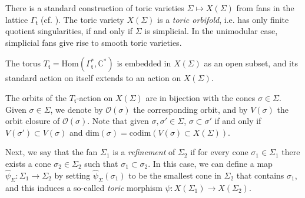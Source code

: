 There is a standard construction of toric varieties $\Sigma\mapsto X(\Sigma)$ 
from fans in the lattice $\Gamma_\mathfrak{t}$ (cf.  \cite[\S1.4]{Fulton}). The 
toric variety $X(\Sigma)$ is a \textit{toric orbifold}, i.e.  has only finite 
quotient singularities, if and only if $\Sigma$ is simplicial. In the 
unimodular case, simplicial fans give rise to smooth toric varieties. 


The torus $T_{\mathfrak{t}} = \mathrm{Hom}(\Gamma_\mathfrak{t}^*, 
\mathbb{C}^*)$ is embedded in $X(\Sigma)$ as an open subset, and its 
standard action on itself extends to an action on $X(\Sigma)$.




\begin{nota}\label{notation:toricorb}
The orbits of the $T_{\mathfrak{t}}$-action on 
$X(\Sigma)$ are in bijection with the cones $\sigma\in\Sigma$. Given 
$\sigma\in\Sigma$, we denote by $\mathcal{O}(\sigma)$ the corresponding orbit, 
and by $V(\sigma)$ the orbit closure of $\mathcal{O}(\sigma)$. Note that given $\sigma, \sigma'\in\Sigma$, 
$\sigma\subset\sigma'$ if and only if $V({\sigma'})\subset V(\sigma)$ and 
$\mathrm{dim}(\sigma)=\mathrm{codim}(V(\sigma)\subset X(\Sigma))$. 
\end{nota}



Next, we say that the fan $\Sigma_1$ is a \textit{refinement} of $\Sigma_2$ if for every cone $\sigma_1\in\Sigma_1$ there exists a cone $\sigma_2\in\Sigma_2$ such that $\sigma_1 \subset \sigma_2$. In this case, we can define a map $\widehat{\psi}_\Sigma: \Sigma_1\to \Sigma_2$ by setting $\widehat{\psi}_\Sigma(\sigma_1)$ to be the smallest cone in $\Sigma_2$ that contains $\sigma_1$, and this induces a so-called  \textit{toric} morphism $\psi: X(\Sigma_1) \to X(\Sigma_2)$.


